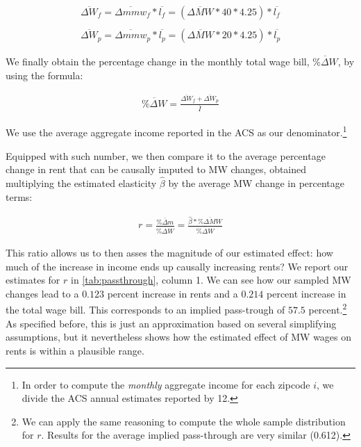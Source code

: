 \begin{align}
	\overline{\Delta W}_{f} = \overline{\Delta mmw}_{f} * \overline{l_{f}} = (\overline{\Delta MW} * 40 * 4.25) * \overline{l_{f}} \\ 
	\nonumber \\
	\overline{\Delta W}_{p} = \overline{\Delta mmw}_{p} * \overline{l_{p}} = (\overline{\Delta MW} * 20 * 4.25) * \overline{l_{p}}
\end{align}


We finally obtain the percentage change in the monthly total wage  bill, $\overline{\% \Delta W}$, 
by using the formula: 

\begin{align}\label{eq:benchmark_Dwage_pct}
	\overline{\% \Delta W} = \frac{\overline{\Delta W}_{f} + \overline{\Delta W}_{p}}{\overline{I}}
\end{align}

We use the average aggregate income reported in the ACS as our denominator.\footnote{In 
	order to compute the \textit{monthly} aggregate income for each zipcode $i$, we divide 
	the ACS annual estimates reported by 12.}

Equipped with such number, we then compare it to the average percentage change in rent that 
can be causally imputed to MW changes, obtained multiplying the estimated elasticity $\hat{\beta}$ 
by the average MW change in percentage terms: 

\begin{align}
	r = \frac{\overline{\% \Delta m}}{\overline{\% \Delta W}} = \frac{\hat{\beta}*\overline{\% \Delta MW}}{\overline{\% \Delta W}} 
\end{align}

This ratio allows us to then asses the magnitude of our estimated effect: how much of the 
increase in income ends up causally increasing rents? We report our estimates for $r$ in 
\autoref{tab:passthrough}, column 1. We can see how our sampled MW changes lead to a $0.123$ 
percent increase in rents and a $0.214$ percent increase in the total wage bill. This corresponds 
to an implied pass-trough of $57.5$ percent.\footnote{We can apply the same reasoning to compute 
	the whole sample distribution for $r$. Results for the average implied pass-through are very similar (0.612).}
As specified before, this is just an approximation based on several simplifying assumptions, but it 
nevertheless shows how the estimated effect of MW wages on rents is within a plausible range. 

